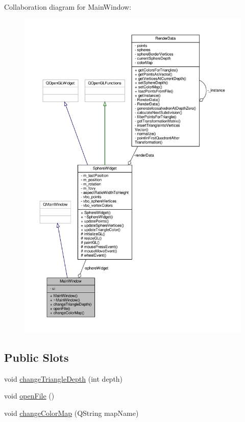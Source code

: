 Collaboration diagram for Main\+Window\+:\nopagebreak
\begin{figure}[H]
\begin{center}
\leavevmode
\includegraphics[width=350pt]{class_main_window__coll__graph}
\end{center}
\end{figure}
\subsection*{Public Slots}
\begin{DoxyCompactItemize}
\item 
void \hyperlink{class_main_window_a7bdf36376a7474c5218923ed66baa937}{change\+Triangle\+Depth} (int depth)
\item 
void \hyperlink{class_main_window_a288b768c3c21a9171bdc56fe845ece8b}{open\+File} ()
\item 
void \hyperlink{class_main_window_a1cfcf14a3dbba8db45a2444a0fbe5a9f}{change\+Color\+Map} (Q\+String map\+Name)
\end{DoxyCompactItemize}
